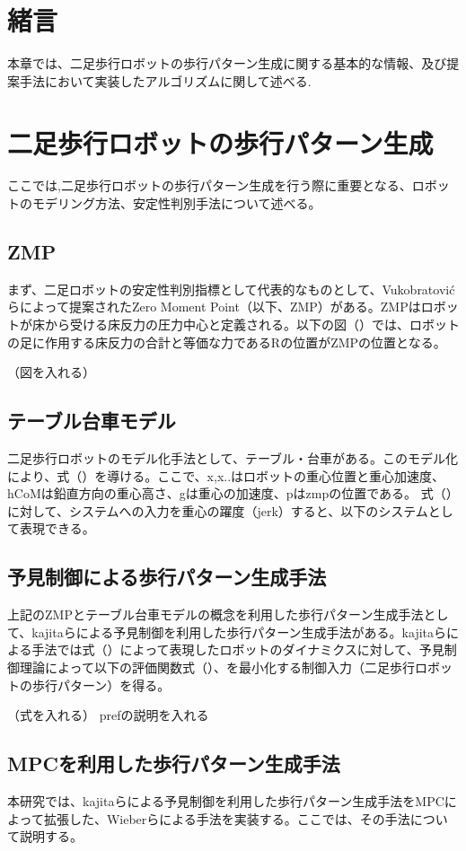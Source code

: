 \section{緒言}
本章では、二足歩行ロボットの歩行パターン生成に関する基本的な情報、及び提案手法において実装したアルゴリズムに関して述べる.

\section{二足歩行ロボットの歩行パターン生成}
ここでは,二足歩行ロボットの歩行パターン生成を行う際に重要となる、ロボットのモデリング方法、安定性判別手法について述べる。

\subsection{ZMP}
まず、二足ロボットの安定性判別指標として代表的なものとして、Vukobratovićらによって提案されたZero Moment Point（以下、ZMP）\cite{VUKOBRATOVIC19721}がある。ZMPはロボットが床から受ける床反力の圧力中心と定義される。以下の図（）では、ロボットの足に作用する床反力の合計と等価な力であるRの位置がZMPの位置となる。

（図を入れる）

\subsection{テーブル台車モデル}
二足歩行ロボットのモデル化手法として、テーブル・台車がある。このモデル化により、式（）を導ける。ここで、x,x..はロボットの重心位置と重心加速度、hCoMは鉛直方向の重心高さ、gは重心の加速度、pはzmpの位置である。
式（）に対して、システムへの入力を重心の躍度（jerk）すると、以下のシステムとして表現できる。

\subsection{予見制御による歩行パターン生成手法}
上記のZMPとテーブル台車モデルの概念を利用した歩行パターン生成手法として、kajitaらによる予見制御を利用した歩行パターン生成手法\cite{PREVIEW}がある。kajitaらによる手法では式（）によって表現したロボットのダイナミクスに対して、予見制御理論によって以下の評価関数式（）、を最小化する制御入力（二足歩行ロボットの歩行パターン）を得る。

（式を入れる）
prefの説明を入れる

\subsection{MPCを利用した歩行パターン生成手法}
本研究では、kajitaらによる予見制御を利用した歩行パターン生成手法\cite{PREVIEW}をMPCによって拡張した、Wieberらによる手法\cite{WIEBER}を実装する。ここでは、その手法\cite{WIEBER}について説明する。


